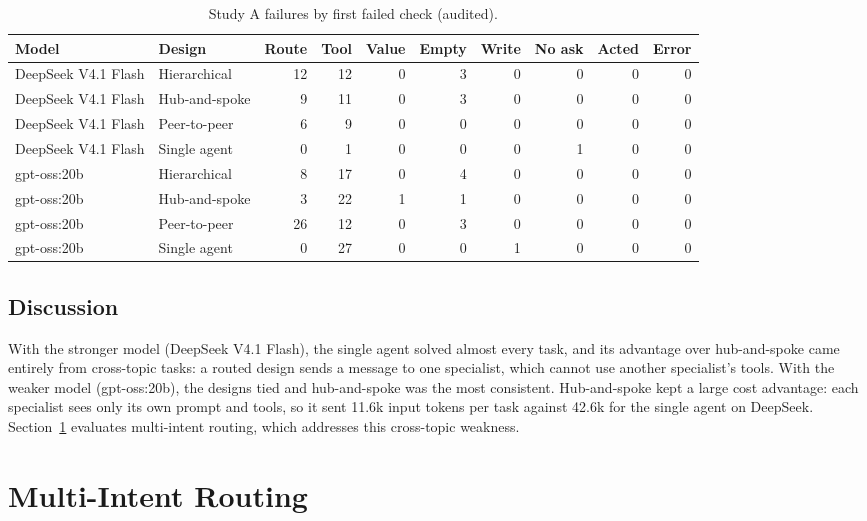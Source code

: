 \documentclass[11pt,a4paper]{article}
\begin{document}
\begin{table}[H]
\centering
\footnotesize
\caption{Study A failures by first failed check (audited).}\label{tab:a-failures}
\begin{tabular}{llrrrrrrrr}
\toprule
\textbf{Model} & \textbf{Design} & \textbf{Route} & \textbf{Tool} & \textbf{Value} & \textbf{Empty} & \textbf{Write} & \textbf{No ask} & \textbf{Acted} & \textbf{Error} \\
\midrule
DeepSeek V4.1 Flash & Hierarchical & 12 & 12 & 0 & 3 & 0 & 0 & 0 & 0 \\
DeepSeek V4.1 Flash & Hub-and-spoke & 9 & 11 & 0 & 3 & 0 & 0 & 0 & 0 \\
DeepSeek V4.1 Flash & Peer-to-peer & 6 & 9 & 0 & 0 & 0 & 0 & 0 & 0 \\
DeepSeek V4.1 Flash & Single agent & 0 & 1 & 0 & 0 & 0 & 1 & 0 & 0 \\
gpt-oss:20b & Hierarchical & 8 & 17 & 0 & 4 & 0 & 0 & 0 & 0 \\
gpt-oss:20b & Hub-and-spoke & 3 & 22 & 1 & 1 & 0 & 0 & 0 & 0 \\
gpt-oss:20b & Peer-to-peer & 26 & 12 & 0 & 3 & 0 & 0 & 0 & 0 \\
gpt-oss:20b & Single agent & 0 & 27 & 0 & 0 & 1 & 0 & 0 & 0 \\
\bottomrule
\end{tabular}
\end{table}


\subsection{Discussion}
With the stronger model (DeepSeek V4.1 Flash), the single agent solved almost every task, and its advantage over hub-and-spoke came entirely from cross-topic tasks: a routed design sends a message to one specialist, which cannot use another specialist's tools. With the weaker model (gpt-oss:20b), the designs tied and hub-and-spoke was the most consistent. Hub-and-spoke kept a large cost advantage: each specialist sees only its own prompt and tools, so it sent 11.6k input tokens per task against 42.6k for the single agent on DeepSeek. Section~\ref{sec:mi} evaluates multi-intent routing, which addresses this cross-topic weakness.

\section{Multi-Intent Routing}\label{sec:mi}
\end{document}
